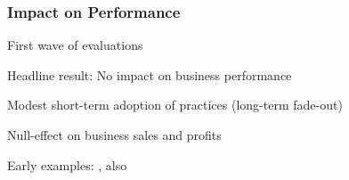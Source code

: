 \documentclass[hideothersubsections, usenames,dvipsnames,11pt]{beamer}
\newenvironment{itemize_2pt}{\itemize\addtolength{\itemsep}{2pt}}{\enditemize}
\begin{document}

\begin{frame}
\frametitle{Impact on Performance}
First wave of evaluations
	\begin{itemize_2pt}
	\item  Headline result: \textcolor{bdf}{No impact on business performance}
	\begin{itemize_2pt}
		\item Modest short-term adoption of practices (long-term fade-out)
		\item Null-effect on business sales and profits
		\item Early examples: \citet{Field2010, Karlan2011, Bruhn2013}, also \citet[][WP in 2014]{Gine2021} 
	
	\end{itemize_2pt}
\end{itemize_2pt}
\end{frame}
\end{document}
